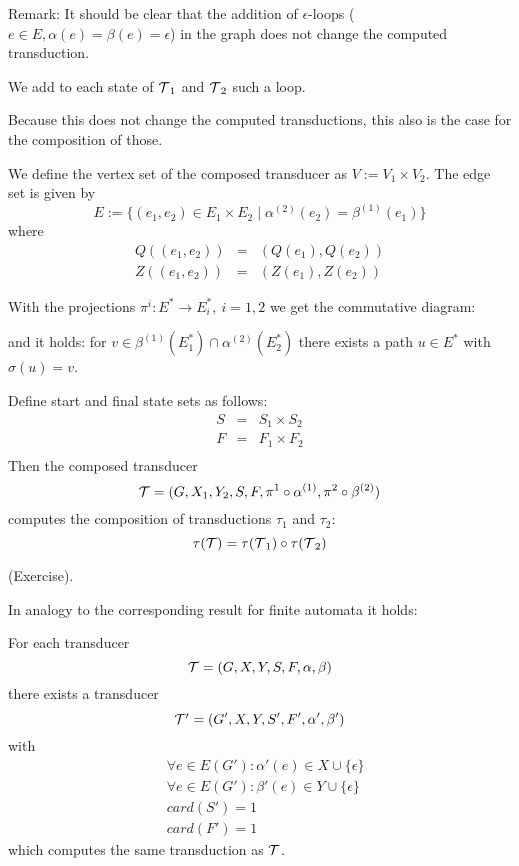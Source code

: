 Remark: It should be clear that the addition of $\epsilon$-loops ($e \in E,
\alpha(e) = \beta(e) = \epsilon$) in the graph does not change the computed
transduction.

We add to each state of $\mbox{$\mathcal{T}$}_1$ and $\mbox{$\mathcal{T}$}_2$ such a loop.

Because this does not change the computed transductions, this also is the case
for the composition of those.

We define the vertex set of the composed transducer as $V := V_1 \times V_2$.
The edge set is given by
\[ E := \{ (e_1, e_2) \in E_1 \times E_2 \mid \alpha^{(2)}(e_2) =
\beta^{(1)}(e_1) \} \]
where
\begin{eqnarray*}
Q((e_1, e_2)) & = & (Q(e_1), Q(e_2)) \\
Z((e_1, e_2)) & = & (Z(e_1), Z(e_2)) 
\end{eqnarray*}

With the projections $\pi^i : E^* \to E_i^*,\ i = 1,2$ we get the commutative
diagram:

\begin{center}
\end{center}

and it holds: for $v \in \beta^{(1)}(E_1^*) \cap \alpha^{(2)}(E_2^*)$ there
exists a path $u \in E^*$ with $\sigma(u) = v$.

Define start and final state sets as follows:
\begin{eqnarray*}
S & = & S_1 \times S_2 \\
F & = & F_1 \times F_2 \\
\end{eqnarray*}
Then the composed transducer
\[\mbox{$\mathcal{T}$} = (G, X_1, Y_2, S, F, \pi^1 \circ \alpha^{(1)}, \pi^2 \circ
\beta^{(2)})\]
computes the composition of transductions $\tau_1$ and $\tau_2$:
\[ \tau(\mbox{$\mathcal{T}$}) = \tau(\mbox{$\mathcal{T}$}_1) \circ \tau(\mbox{$\mathcal{T}$}_2) \]

(Exercise).

In analogy to the corresponding result for finite automata it holds:

\begin{lemma}
For each transducer
\[\mbox{$\mathcal{T}$} = (G, X, Y, S, F, \alpha, \beta)\] there exists a
transducer \[\mbox{$\mathcal{T'}$} = (G', X, Y, S', F', \alpha', \beta')\] with
\begin{eqnarray*}
& \forall e \in E(G'): \alpha'(e) \in X \cup \{\epsilon\} \\
& \forall e \in E(G'): \beta'(e) \in Y \cup \{\epsilon\} \\
& card(S') = 1 \\
& card(F') = 1
\end{eqnarray*}
which computes the same transduction as $\mbox{$\mathcal{T}$}$.
\end{lemma}

